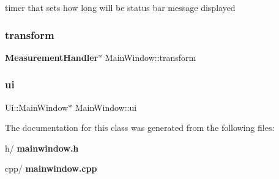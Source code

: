 timer that sets how long will be status bar message displayed \mbox{\label{class_main_window_a6a921ce08975d864ff158f36760802a8}} 
\subsubsection{transform}
{\footnotesize\ttfamily \textbf{ Measurement\+Handler}$\ast$ Main\+Window\+::transform\hspace{0.3cm}{\ttfamily [private]}}

\mbox{\label{class_main_window_a35466a70ed47252a0191168126a352a5}} 
\subsubsection{ui}
{\footnotesize\ttfamily Ui\+::\+Main\+Window$\ast$ Main\+Window\+::ui\hspace{0.3cm}{\ttfamily [private]}}



The documentation for this class was generated from the following files\+:\begin{DoxyCompactItemize}
\item 
h/\textbf{ mainwindow.\+h}\item 
cpp/\textbf{ mainwindow.\+cpp}\end{DoxyCompactItemize}
